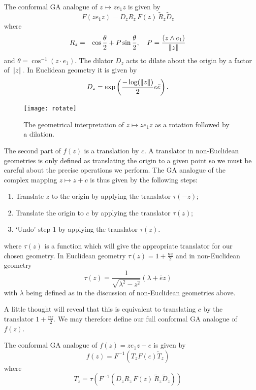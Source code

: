 \begin{definition}
The conformal GA analogue of $z \mapsto ze_1z$ is given by
\[
F(ze_1z) = D_z R_z\,F(z)\,\tilde{R}_z \tilde{D}_z
\]
where
\begin{eqnarray*}
R_z & = & \cos \frac{\theta}{2} + P \sin \frac{\theta}{2},
    \quad
P = \frac{(z \wedge e_1)}{\left\Vert z \right\Vert}
\end{eqnarray*}
and $\theta = \cos^{-1}(z \cdot e_1)$.
The dilator $D_z$ acts to dilate about the origin by a factor of
$\left\Vert z \right\Vert$. In Euclidean geometry it is given by
\[
D_z = \exp\left( \frac{-\log(\left\Vert z \right\Vert)}{2} e\bar{e} \right).
\]
\end{definition}

\begin{figure}
\centering
\texttt{[image: rotate]}
\caption{\label{fig:rotate}%
  The geometrical interpretation of $z \mapsto ze_1z$ as a rotation followed by a dilation.
}
\end{figure}

The second part of $f(z)$ is a translation by $c$. A translator in non-Euclidean
geometries is only defined as translating the origin to a given point so we must be
careful about the precise operations we perform. The GA analogue of the
complex mapping $z \mapsto z + c$ is thus given by the following steps:
\begin{enumerate}
\item Translate $z$ to the origin by applying the translator $\tau(-z)$;
\item Translate the origin to $c$ by applying the translator $\tau(z)$;
\item `Undo' step 1 by applying the translator $\tau(z)$.
\end{enumerate}
where $\tau(z)$ is a function which will give the appropriate translator for our 
chosen geometry. In Euclidean geometry $\tau(z) = 1 + \frac{nz}{2}$ and in
non-Euclidean geometry
\[
\tau(z) = \frac{1}{\sqrt{\lambda^2 - z^2}}(\lambda + \bar{e}z)
\]
with $\lambda$ being defined as in the discussion of non-Euclidean geometries above.

A little thought will reveal that this is equivalent to translating $c$ by the translator
$1 + \frac{nz}{2}$. We may therefore define our full conformal GA analogue of $f(z)$.

\begin{definition}
The conformal GA analogue of $f(z) = ze_1z + c$ is given by
\[
f(z) = F^{-1}(T_z F(c) \tilde{T}_z)
\]
where
\[
T_z = \tau(F^{-1}(D_z R_z\,F(z)\,\tilde{R}_z \tilde{D}_z))
\]
\end{definition}

